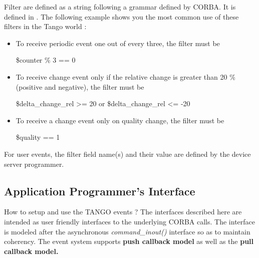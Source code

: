 \vspace{0.3cm}

Filter are defined as a string following a grammar defined by CORBA.
It is defined in \cite{Notif_doc}. The following example shows you
the most common use of these filters in the Tango world :
\begin{itemize}
\item To receive periodic event one out of every three, the filter must
be \begin{center}\textquotedbl{}\$counter \% 3 == 0\textquotedbl{}\end{center}
\item To receive change event only if the relative change is greater than
20 \% (positive and negative), the filter must be \begin{center}\textquotedbl{}\$delta\_change\_rel
>= 20 or \$delta\_change\_rel <= -20\textquotedbl{}\end{center}
\item To receive a change event only on quality change, the filter must
be \begin{center}\textquotedbl{}\$quality == 1\textquotedbl{}\end{center}
\end{itemize}
For user events, the filter field name(s) and their value are defined
by the device server programmer.

\subsection{Application Programmer's Interface}

How to setup and use the TANGO events ? The interfaces described here
are intended as user friendly interfaces to the underlying CORBA calls.
The interface is modeled after the asynchronous
\emph{command\_inout()} interface so as to
maintain coherency. The event system supports \textbf{push callback
model} as well as the \textbf{pull callback model.}

